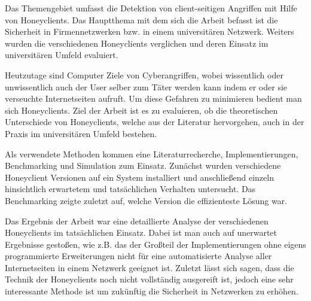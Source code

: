 
 Das Themengebiet umfasst die Detektion von
client-seitigen Angriffen mit Hilfe von Honeyclients. Das Hauptthema mit dem
sich die Arbeit befasst ist die  Sicherheit in Firmennetzwerken bzw. in einem
universitären Netzwerk. Weiters wurden die verschiedenen Honeyclients
verglichen und deren Einsatz im universitären Umfeld evaluiert.~\cite[Kap.~1]{Kekeiss}

 Heutzutage sind Computer Ziele von Cyberangriffen,
wobei wissentlich oder unwissentlich auch der User selber zum Täter werden
kann indem er oder sie verseuchte Internetseiten aufruft. Um diese Gefahren zu
minimieren bedient man sich Honeyclients. Ziel der Arbeit ist es zu
evaluieren, ob die theoretischen Unterschiede von Honeyclients, welche aus
der Literatur hervorgehen, auch in der Praxis im universitären Umfeld
bestehen.~\cite[Kap.~1,~2]{Kekeiss}

 Als verwendete Methoden kommen eine
Literaturrecherche, Implementierungen, Benchmarking und Simulation zum
Einsatz. Zunächst wurden verschiedene Honeyclient Versionen auf ein System
installiert und anschließend einzeln hinsichtlich erwartetem und tatsächlichen
Verhalten untersucht. Das Benchmarking zeigte zuletzt auf, welche  Version die
effizienteste Lösung war.~\cite[Kap.~4,~6,~7]{Kekeiss}

 Das Ergebnis der Arbeit war eine detaillierte Analyse der
verschiedenen Honeyclients im tatsächlichen Einsatz. Dabei ist man auch auf
unerwartet Ergebnisse gestoßen, wie z.B. das der Großteil der
Implementierungen ohne eigens programmierte Erweiterungen nicht für eine
automatisierte Analyse aller Internetseiten in einem Netzwerk geeignet ist.
Zuletzt lässt sich sagen, dass die Technik der Honeyclients noch nicht
vollständig ausgereift ist, jedoch eine sehr interessante Methode ist um
zukünftig die Sicherheit in Netzwerken zu erhöhen.~\cite[Kap.~6--8]{Kekeiss}


